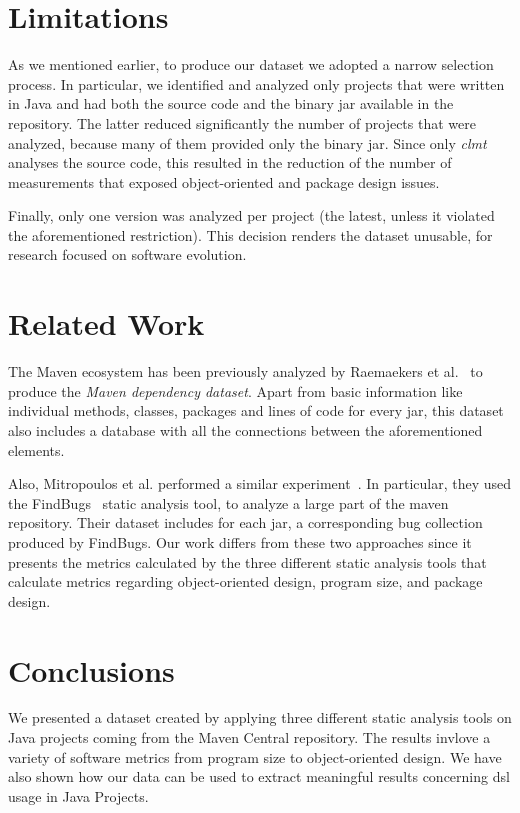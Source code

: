 \documentclass[conference]{IEEEtran}
\begin{document}
\section{Limitations}
\label{sec:limit}

As we mentioned earlier, to produce our dataset we adopted a narrow selection process. In particular, we identified and analyzed only projects that were written in Java and had both the source code and the binary {\sc jar} available in the repository. The latter reduced significantly the number of projects that were analyzed, because many of them provided only the binary {\sc jar}. Since only \textit{clmt} analyses the source code, this resulted in the reduction of the number of measurements that exposed object-oriented and package design issues.

Finally, only one version was analyzed per project (the latest, unless it violated the aforementioned restriction).
This decision renders the dataset unusable, for research focused on software evolution.

\section{Related Work}
\label{sec:rel}

The Maven ecosystem has been previously analyzed by Raemaekers et al.~\cite{RDV13} to produce the {\it Maven dependency dataset}. Apart from basic information like individual methods, classes, packages and lines of code for every {\sc jar}, this dataset also includes a database with all the connections between the aforementioned elements.

Also, Mitropoulos et al. performed a similar experiment~\cite{MKLGS14}. In particular, they used the FindBugs~\cite{HP04} static analysis tool, to analyze a large part of the maven repository. Their dataset includes for each {\sc jar}, a corresponding bug collection produced by FindBugs. Our work differs from these two approaches since it presents the metrics calculated by the three different static analysis tools that calculate metrics regarding object-oriented design, program size, and package design.

\section{Conclusions}
\label{sec:conc}

We presented a dataset created by applying three different static analysis tools on Java projects coming from the Maven Central repository. The results invlove a variety of software metrics from program size to object-oriented design.
We have also shown how our data can be used to extract meaningful results concerning {\sc dsl} usage in Java Projects.
\end{document}
